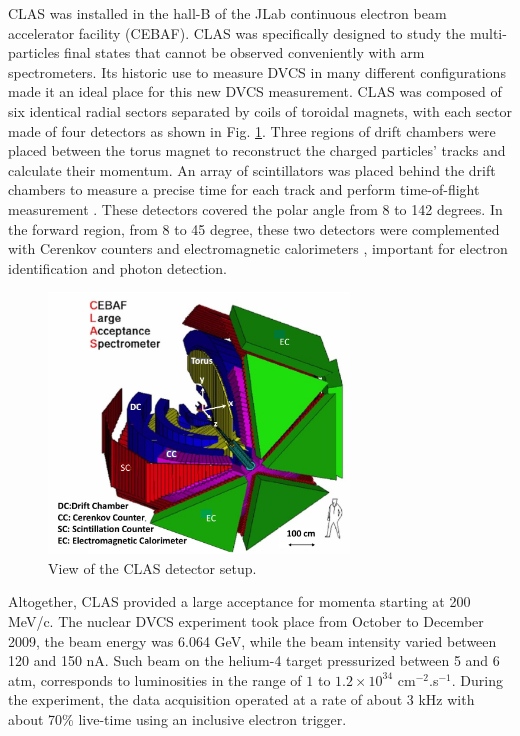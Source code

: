 \documentclass{article}
\begin{document}
CLAS \cite{Mecking:2003zu} was installed in the hall-B of the JLab continuous electron beam 
accelerator facility (CEBAF). CLAS was specifically designed to study the multi-particles final states
that cannot be observed conveniently with arm spectrometers. Its historic use to measure DVCS in many different 
configurations made it an ideal place for this new DVCS measurement. CLAS was composed of six identical radial 
sectors separated by coils of toroidal magnets, with each sector made of four detectors 
as shown in Fig. \ref{fig:CLAS}. Three regions of drift chambers \cite{Mestayer:2000we} 
were placed between the torus magnet to reconstruct the charged particles' tracks and 
calculate their momentum. An array of scintillators was placed behind the drift chambers to measure 
a precise time for each track and perform time-of-flight measurement 
\cite{Smith:1999ii}. These detectors covered the polar angle from 8 to 142 degrees. 
In the forward region, from 8 to 45 degree, these two detectors were complemented with 
Cerenkov counters \cite{Adams:2001kk} and electromagnetic calorimeters \cite{Amarian:2001zs},
important for electron identification and photon detection. 

\begin{figure}[tbp!]
\center
\includegraphics[width=8cm]{fig3/CLAS_geantview-PS.jpg}
	\caption{View of the CLAS detector setup.}
\label{fig:CLAS}
\end{figure}


Altogether, CLAS provided a large acceptance for momenta 
starting at 200 MeV/c. The nuclear DVCS experiment took place from October to December 2009,
the beam energy was 6.064 GeV, while the beam intensity varied
between 120 and 150 nA. Such beam on the helium-4 target pressurized between 5 and 6 atm,
corresponds to luminosities in the range of $1$ to $1.2 \times 10^{34}$ cm$^{-2}$.s$^{-1}$.
During the experiment, the data acquisition operated at a rate of about 3 kHz with about 70\% live-time
using an inclusive electron trigger. 
\end{document}
